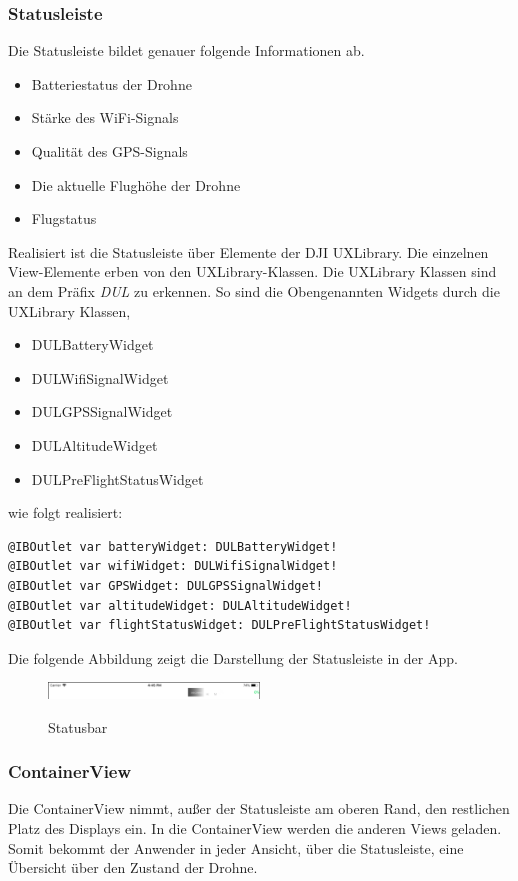 \subsubsection{Statusleiste}
Die Statusleiste bildet genauer folgende Informationen ab. 
\begin{itemize}
	\item Batteriestatus der Drohne
	\item Stärke des WiFi-Signals
	\item Qualität des GPS-Signals
	\item Die aktuelle Flughöhe der Drohne 
	\item Flugstatus
\end{itemize}
Realisiert ist die Statusleiste über Elemente der DJI UXLibrary. Die einzelnen View-Elemente erben von den UXLibrary-Klassen. Die UXLibrary Klassen sind an dem Präfix \textit{\textit{DUL}} zu erkennen. So sind die Obengenannten Widgets durch die UXLibrary Klassen,
\begin{itemize}
	\item DULBatteryWidget
	\item DULWifiSignalWidget
	\item DULGPSSignalWidget
	\item DULAltitudeWidget
	\item DULPreFlightStatusWidget
\end{itemize}
wie folgt realisiert:
\newline
\begin{lstlisting}[caption={Statusleiste}]
@IBOutlet var batteryWidget: DULBatteryWidget!
@IBOutlet var wifiWidget: DULWifiSignalWidget!
@IBOutlet var GPSWidget: DULGPSSignalWidget!
@IBOutlet var altitudeWidget: DULAltitudeWidget!
@IBOutlet var flightStatusWidget: DULPreFlightStatusWidget!
\end{lstlisting}
Die folgende Abbildung zeigt die Darstellung der Statusleiste in der App.
\newline
\begin{figure}[H]
	\begin{center}
		{\includegraphics[width=0.5\textwidth]{images/Statusbar.png}}
		\caption{Statusbar}
	\end{center}
\end{figure}
\subsubsection{ContainerView}
Die ContainerView nimmt, außer der Statusleiste am oberen Rand, den restlichen Platz des Displays ein. In die ContainerView werden die anderen Views geladen. Somit bekommt der Anwender in jeder Ansicht, über die Statusleiste, eine Übersicht über den Zustand der Drohne.  
